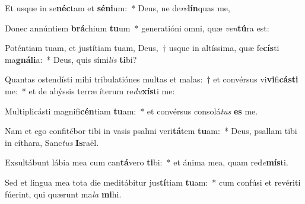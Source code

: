 \item Et usque in se\textbf{néc}tam et \textbf{sé}\textbf{ni}um:~* Deus, ne de\textit{re}\textbf{lín}quas me,
\item Donec annúntiem \textbf{brá}chium \textbf{tu}um~* generatióni omni, quæ \textit{ven}\textbf{tú}ra est:
\item Poténtiam tuam, et justítiam tuam, Deus,~† usque in altíssima, quæ fe\textbf{cís}ti ma\textbf{gná}\textbf{li}a:~* Deus, quis sími\textit{lis} \textbf{ti}bi?
\item Quantas ostendísti mihi tribulatiónes multas et malas:~† et convérsus vi\textbf{vi}fi\textbf{cás}\textbf{ti} me:~* et de abýssis terræ íterum re\textit{du}\textbf{xís}ti me:
\item Multiplicásti magnifi\textbf{cén}tiam \textbf{tu}am:~* et convérsus consolá\textit{tus} \textbf{es} me.
\item Nam et ego confitébor tibi in vasis psalmi veri\textbf{tá}tem \textbf{tu}am:~* Deus, psallam tibi in cíthara, Sanc\textit{tus} \textbf{Is}raël.
\item Exsultábunt lábia mea cum can\textbf{tá}vero \textbf{ti}bi:~* et ánima mea, quam red\textit{e}\textbf{mís}ti.
\item Sed et lingua mea tota die meditábitur jus\textbf{tí}tiam \textbf{tu}am:~* cum confúsi et revériti fúerint, qui quærunt ma\textit{la} \textbf{mi}hi.
